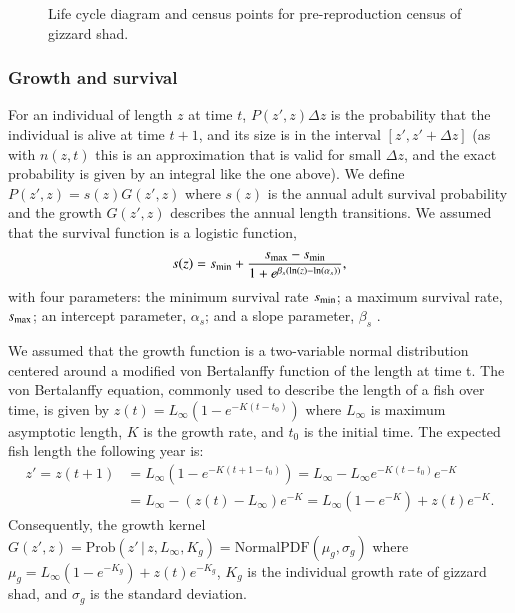 \documentclass[preprint,review,12pt,authoryear]{elsarticle}
\def\ds{\displaystyle}
\begin{document}
\begin{figure}
\begin{center}
\end{center}
 \caption{\small{Life cycle diagram and census points for pre-reproduction census of gizzard shad.}}
 \label{life_cycle}
\end{figure}

\subsubsection{Growth and survival}
For an individual of length $z$ at time $t$, $P(z',z)\Delta z$ is the probability that the individual is alive at time $t+1$, and its size is in the interval $[z', z' + \Delta z]$ (as with $n(z,t)$ this is an approximation that is valid for small $\Delta z$, and the exact probability is given by an integral like the one above). We define $P(z', z) = s(z)G(z',z)$ where $s(z)$ is the annual adult survival probability and the growth $G(z',z)$ describes the annual length transitions. 
We assumed that the survival function is a logistic function,
\begin{equation}\label{eq:surv}
s(z) = s_{\rm min} + \frac{s_{\rm max}-s_{\rm min}}{1+e^{\beta_s(\ln(z)-\ln(\alpha_s))}},
\end{equation}
with four parameters: the minimum survival rate $s_{\rm min}$; a maximum survival rate, $s_{\rm max}$; an intercept parameter, $\alpha_{s}$; and a slope parameter, $\beta_{s}$ \citep{bolker2008ecological}.  

We assumed that the growth function is a two-variable normal distribution centered around a modified von Bertalanffy function of the length at time t. 
The von Bertalanffy equation, commonly used to describe the length of a fish over time, is given by $\ds z(t) = L_{\infty} \left(1-e^{-K(t-t_0)} \right)$ where $L_\infty$ is maximum asymptotic length, $K$ is the growth rate, and $t_0$ is the initial time. 
The expected fish length the following year is:
\begin{align*}
 z' =z(t+1) & =  L_{\infty} \left(1-e^{-K(t+1-t_0)} \right) =  L_{\infty} - L_{\infty}e^{-K(t-t_0)} e^{-K} \\
 & =   L_\infty - \left( z(t)-L_\infty \right) e^{-K} =   L_{\infty} \left(1-e^{-K} \right) + z(t)e^{-K}. 
 \end{align*}
Consequently, the growth kernel
$\ds G(z',z) = \mathrm{Prob}(z' \, | \,  z, L_{\infty}, K_g) = \mathrm{Normal PDF}(\mu_g, \sigma_g)$
where $\mu_g =  L_{\infty} \left(1-e^{-K_g} \right) + z(t)e^{-K_g}$, $K_g$ is the individual growth rate of gizzard shad, and $\sigma_g$ is the standard deviation.
\end{document}
